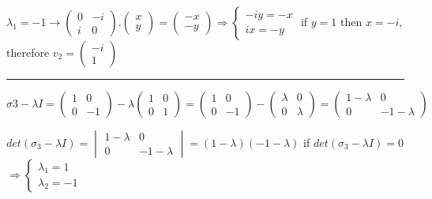\documentclass[fleqn]{article}
\begin{document}
\begin{enumerate}
       \textcolor{hwColor}{ 
        $
        \lambda_1=-1  \rightarrow 
        \begin{pmatrix}
         0 & -i \\
         i & 0  
        \end{pmatrix}.\begin{pmatrix}
          x \\
          y
        \end{pmatrix}=\begin{pmatrix}
          -x \\
          -y
        \end{pmatrix}
        \Longrightarrow 
        \begin{cases}
          -iy=-x \\
          ix=-y
        \end{cases}
        $
        if $y=1$ then $x=-i$, therefore $v_2=\begin{pmatrix}
          -i \\
          1
        \end{pmatrix}$
       }

      \textcolor{hwColor}{
        \rule{16cm}{0.4pt}
      }

      \textcolor{hwColor}{ 
        $\sigma3-\lambda I=
          \begin{pmatrix}
            1 & 0 \\
            0 & -1 
          \end{pmatrix}-
          \lambda \begin{pmatrix}
            1 & 0 \\
            0 & 1
          \end{pmatrix}=
          \begin{pmatrix}
            1 & 0 \\
            0 & -1 
          \end{pmatrix}-
          \begin{pmatrix}
            \lambda & 0 \\
            0 & \lambda
          \end{pmatrix}=
          \begin{pmatrix}
            1-\lambda & 0 \\
            0 & -1-\lambda 
          \end{pmatrix}
        $
      }

      \textcolor{hwColor}{ 
        $det(\sigma_3-\lambda I)=
          \begin{vmatrix}
            1-\lambda & 0 \\
            0 & -1-\lambda 
          \end{vmatrix}= (1-\lambda)(-1-\lambda)
        $
        if $det(\sigma_3-\lambda I)=0$ 
        $
          \Longrightarrow
          \begin{cases}
            \lambda_1=1 \\
            \lambda_2=-1
          \end{cases}
        $
      }


\end{enumerate}
\end{document}
